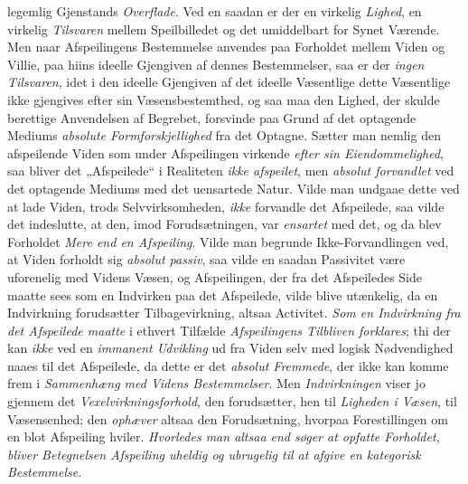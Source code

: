 \documentclass[12pt,a4paper]{book}
\newcommand{\opage}[1]{\marginnote{\footnotesize\textit{[#1]}}}
\begin{document}
legemlig Gjenstands \emph{Overflade}. Ved en saadan er der en virkelig \emph{Lighed}, en virkelig \emph{Tilsvaren} mellem Speilbilledet og det umiddelbart for Synet
Værende. Men naar Afspeilingens Bestemmelse anvendes paa Forholdet
mellem Viden og Villie, paa hiins ideelle Gjengiven af dennes
Bestemmelser, saa er der \emph{ingen Tilsvaren}, idet i den ideelle Gjengiven
af det ideelle Væsentlige dette Væsentlige ikke gjengives efter sin
Væsensbestemthed, og saa maa den Lighed, der skulde berettige
Anvendelsen af Begrebet, forsvinde paa Grund af det optagende Mediums
\emph{absolute Formforskjellighed} fra det Optagne. Sætter \opage{150}man nemlig den
afspeilende Viden som under Afspeilingen virkende \emph{efter sin Eiendommelighed}, saa bliver det „Afspeilede“ i Realiteten \emph{ikke afspeilet}, men \emph{absolut forvandlet} ved det optagende Mediums med det
uensartede Natur. Vilde man undgaae dette ved at lade Viden, trods
Selvvirksomheden, \emph{ikke} forvandle det Afspeilede, saa vilde det
indeslutte, at den, imod Forudsætningen, var \emph{ensartet} med det, og da blev Forholdet \emph{Mere end en Afspeiling}. Vilde man begrunde
Ikke-Forvandlingen ved, at Viden forholdt sig \emph{absolut passiv}, saa vilde
en saadan Passivitet være uforenelig med Videns Væsen, og Afspeilingen,
der fra det Afspeiledes Side maatte sees som en Indvirken paa det
Afspeilede, vilde blive utænkelig, da en Indvirkning forudsætter
Tilbagevirkning, altsaa Activitet. \emph{Som en Indvirkning fra det Afspeilede maatte} i ethvert Tilfælde \emph{Afspeilingens Tilbliven forklares};
thi der kan \emph{ikke} ved en \emph{immanent Udvikling} ud fra Viden selv med logisk
Nødvendighed naaes til det Afspeilede, da dette er det \emph{absolut Fremmede}, der ikke kan komme frem i \emph{Sammenhæng med Videns Bestemmelser}.
Men \emph{Indvirkningen} viser jo gjennem det \emph{Vexelvirkningsforhold}, den forudsætter, hen til \emph{Ligheden i Væsen}, til Væsensenhed; den \emph{ophæver} altsaa den Forudsætning, hvorpaa Forestillingen om en blot Afspeiling
hviler. \emph{Hvorledes man altsaa end søger at opfatte Forholdet, bliver Betegnelsen Afspeiling uheldig og ubrugelig til at afgive en kategorisk Bestemmelse}.

\medskip
\end{document}
